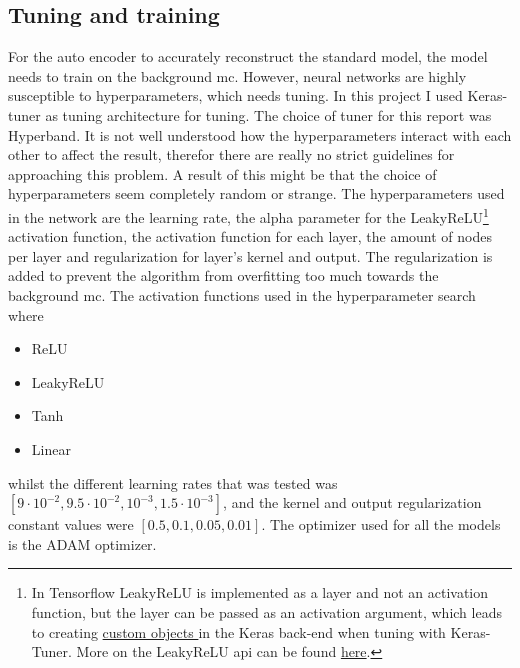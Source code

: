 \documentclass[ reprint, amsmath,amssymb, aps, nofootinbib]{revtex4-2}
\begin{document}
 

\subsection{Tuning and training}

For the auto encoder to accurately reconstruct the standard model, the model needs to train on the background mc. However, neural networks are highly susceptible to hyperparameters, which needs tuning. In this project I used Keras-tuner\cite{omalley2019kerastuner} as tuning architecture for tuning. The choice of tuner for this report was Hyperband\cite{JMLR:v18:16-558}. It is not well understood how the hyperparameters interact with each other to affect the result, therefor there are really no strict guidelines for approaching this problem. A result of this might be that the choice of hyperparameters seem completely random or strange. The hyperparameters used in the network are the learning rate, the alpha parameter for the LeakyReLU\footnote{In Tensorflow LeakyReLU is implemented as a layer and not an activation function, but the layer can be passed as an activation argument, which leads to creating \href{https://www.tensorflow.org/api_docs/python/tf/keras/utils/get_custom_objects}{custom objects } in the Keras back-end when tuning with Keras-Tuner. More on the LeakyReLU api can be found \href{https://www.tensorflow.org/api_docs/python/tf/keras/layers/LeakyReLU}{here}.} activation function, the activation function for each layer, the amount of nodes per layer and regularization for layer's kernel and output. The regularization is added to prevent the algorithm from overfitting too much towards the background mc. The activation functions used in the hyperparameter search where

\begin{itemize}
    \item ReLU
    \item LeakyReLU
    \item Tanh
    \item Linear
\end{itemize}
whilst the different learning rates that was tested was $[9\cdot 10^{-2}, 9.5\cdot 10^{-2}, 10^{-3}, 1.5\cdot 10^{-3}]$, and the kernel and output regularization constant values were $[0.5, 0.1, 0.05, 0.01]$. The optimizer used for all the models is the ADAM\cite{https://doi.org/10.48550/arxiv.1412.6980} optimizer. \par \par 
\end{document}
